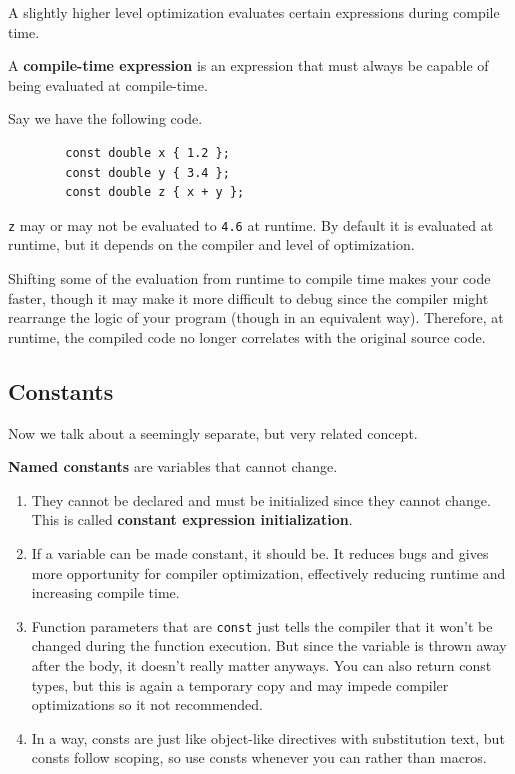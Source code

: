 \documentclass{article}
\newcounter{definition}[section]
\newcounter{example}[section]
\newcounter{code}[section]
\begin{document}
    A slightly higher level optimization evaluates certain expressions during compile time. 

    \begin{definition}
      \label{def:compile-time-expression}
      A \textbf{compile-time expression} is an expression that must always be capable of being evaluated at compile-time. 
    \end{definition}

    \begin{example}
      \label{ex:constant-folding-of-const-doubles}
      Say we have the following code. 
      \begin{lstlisting}
        const double x { 1.2 };
        const double y { 3.4 };
        const double z { x + y }; 
      \end{lstlisting} 
      \texttt{z} may or may not be evaluated to \texttt{4.6} at runtime. By default it is evaluated at runtime, but it depends on the compiler and level of optimization. 
    \end{example}

    Shifting some of the evaluation from runtime to compile time makes your code faster, though it may make it more difficult to debug since the compiler might rearrange the logic of your program (though in an equivalent way). Therefore, at runtime, the compiled code no longer correlates with the original source code. 
  
  \subsection{Constants}

    Now we talk about a seemingly separate, but very related concept. 

    \begin{definition}
      \label{def:constant-variables}
      \textbf{Named constants} are variables that cannot change. 
      \begin{enumerate}
        \item They cannot be declared and must be initialized since they cannot change. This is called \textbf{constant expression initialization}.
        \item If a variable can be made constant, it should be. It reduces bugs and gives more opportunity for compiler optimization, effectively reducing runtime and increasing compile time. 
        \item Function parameters that are \texttt{const} just tells the compiler that it won't be changed during the function execution. But since the variable is thrown away after the body, it doesn't really matter anyways. You can also return const types, but this is again a temporary copy and may impede compiler optimizations so it not recommended. 
        \item In a way, consts are just like object-like directives with substitution text, but consts follow scoping, so use consts whenever you can rather than macros. 
      \end{enumerate}
    \end{definition}
\end{document}
